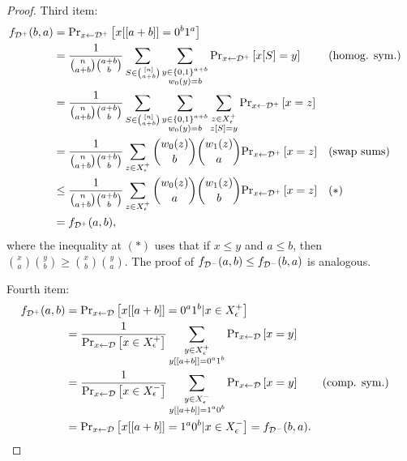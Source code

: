 \begin{proof}
Third item:
    \begin{align*}
        f_{\mathcal{D}^+}(b, a) & = \text{Pr}_{x \leftarrow \mathcal{D}^+}\left[x[[a+b]] = 0^b1^a\right] \\
        & = \frac{1}{\binom{n}{a+b}\binom{a+b}{b}} \sum_{S \in \binom{[n]}{a+b}} 
        \sum_{\substack{y \in \{0, 1\}^{a+b}\\w_0(y)=b}} 
        \text{Pr}_{x \leftarrow \mathcal{D}^+}\left[x[S] = y\right]
        && (\text{homog. sym.}) \\
        & = \frac{1}{\binom{n}{a+b}\binom{a+b}{b}} 
        \sum_{S \in \binom{[n]}{a+b}} 
        \sum_{\substack{y \in \{0, 1\}^{a+b}\\w_0(y)=b}} 
        \sum_{\substack{z\in X^+_\epsilon\\z[S]=y}} \text{Pr}_{x \leftarrow \mathcal{D}^+}\left[x = z\right] \\
        & = \frac{1}{\binom{n}{a+b}\binom{a+b}{b}}
        \sum_{z \in X^+_\epsilon} \binom{w_0(z)}{b} \binom{w_1(z)}{a} \text{Pr}_{x \leftarrow \mathcal{D}^+}\left[x = z\right]
        && (\text{swap sums}) \\
        & \leq \frac{1}{\binom{n}{a+b}\binom{a+b}{b}}
        \sum_{z \in X^+_\epsilon} \binom{w_0(z)}{a} \binom{w_1(z)}{b} \text{Pr}_{x \leftarrow \mathcal{D}^+}\left[x = z\right]
        && (*) \\
        & = f_{\mathcal{D}^+}(a,b),
    \end{align*}
    where the inequality at $(*)$ uses that if $x \leq y$ and $a \leq b$, then 
    $\binom{x}{a} \binom{y}{b} \geq \binom{x}{b} \binom{y}{a}$. The proof of $f_{\mathcal{D}^-}(a, b) \leq f_{\mathcal{D}^-}(b, a)$ 
    is analogous.

Fourth item:
\begin{align*}
    f_{\mathcal{D}^+}(a, b) & = \text{Pr}_{x \leftarrow \mathcal{D}}\left[x[[a+b]] = 0^a1^b | x \in X^+_\epsilon\right] \\
    & = \frac{1}{\text{Pr}_{x \leftarrow \mathcal{D}}\left[x \in X^+_\epsilon\right]}
    \sum_{\substack{y \in X^+_\epsilon\\y[[a+b]] = 0^a1^b}} \text{Pr}_{x \leftarrow \mathcal{D}}\left[x = y\right] \\
    & = \frac{1}{\text{Pr}_{x \leftarrow \mathcal{D}}\left[x \in X^-_\epsilon\right]}
    \sum_{\substack{y \in X^-_\epsilon\\y[[a+b]] = 1^a0^b}} \text{Pr}_{x \leftarrow \mathcal{D}}\left[x = y\right] 
    && (\text{comp. sym.})\\
    & = \text{Pr}_{x \leftarrow \mathcal{D}}\left[x[[a+b]] = 1^a0^b | x \in X^-_\epsilon\right] = f_{\mathcal{D}^-}(b, a).
\end{align*}


\end{proof}



